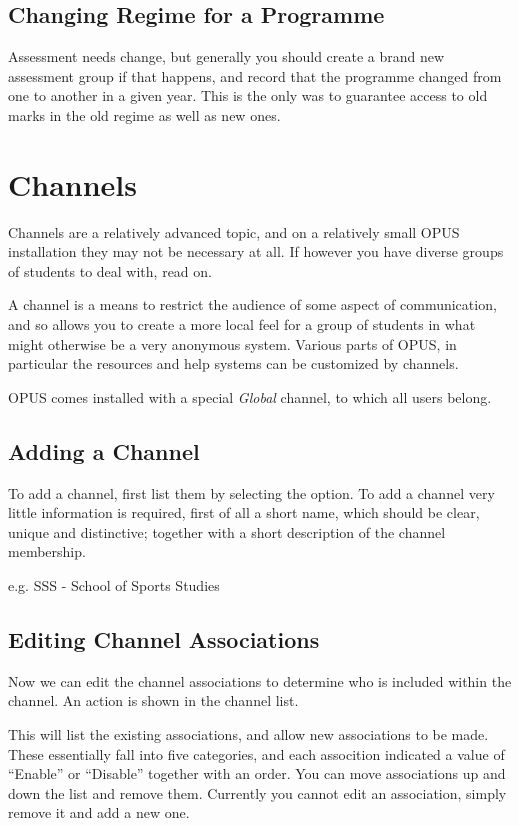 \documentclass[12 pt]{book}
\begin{document}
\subsection{Changing Regime for a Programme}

Assessment needs change, but generally you should create a brand new assessment
group if that happens, and record that the programme changed from one to 
another in a given year. This is the only was to guarantee access to old
marks in the old regime as well as new ones.

\section{Channels}

Channels are a relatively advanced topic, and on a relatively small OPUS
installation they may not be necessary at all. If however you have diverse
groups of students to deal with, read on.

A channel is a means to restrict the audience of some aspect of communication,
and so allows you to create a more local feel for a group of students in what
might otherwise be a very anonymous system. Various parts of OPUS, in particular
the resources and help systems can be customized by channels.

OPUS comes installed with a special \emph{Global} channel, to which all users
belong.

\subsection{Adding a Channel}

To add a channel, first list them by selecting the 
 option. To add a channel very little
information is required, first of all a short name, which should be clear,
unique and distinctive; together with a short description of the channel
membership.

e.g. SSS - School of Sports Studies

\subsection{Editing Channel Associations}

Now we can edit the channel associations to determine who is included within
the channel. An  action is shown in the channel list.

This will list the existing associations, and allow new associations to be
made. These essentially fall into five categories, and each assocition 
indicated a value of ``Enable'' or ``Disable'' together with an order. You
can move associations up and down the list and remove them. Currently you
cannot edit an association, simply remove it and add a new one.
\end{document}
